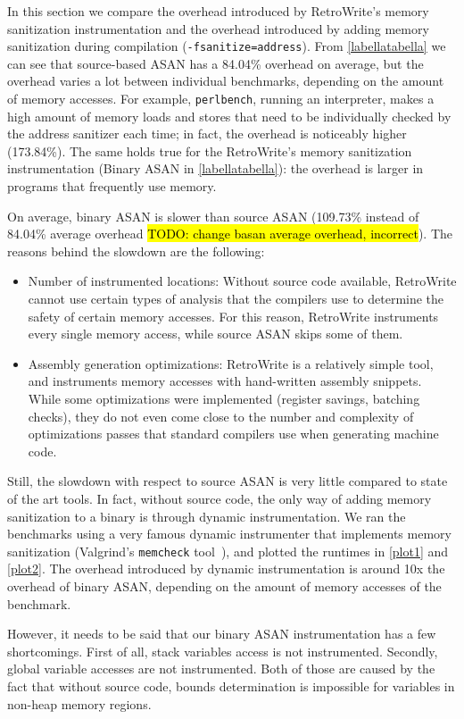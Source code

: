\documentclass[a4paper,11pt,oneside]{report}
\newcommand{\sysname}{RetroWrite\xspace}
\DeclareRobustCommand{\todo}[1]{{\sethlcolor{cyan}\hl{TODO: #1}}}
\begin{document}
In this section we compare the overhead introduced by \sysname's memory
sanitization instrumentation and the overhead introduced by adding memory
sanitization during compilation (\texttt{-fsanitize=address}).  From
\autoref{labellatabella} we can see that source-based ASAN has a 84.04\%
overhead on average, but the overhead varies a lot between individual
benchmarks, depending on the amount of memory accesses. For example,
\texttt{perlbench}, running an interpreter, makes a high amount of memory loads
and stores that need to be individually checked by the address sanitizer each
time; in fact, the overhead is noticeably higher (173.84\%). The same holds
true for the \sysname's memory sanitization instrumentation (Binary ASAN in
\autoref{labellatabella}): the overhead is larger in programs that frequently
use memory. 

On average, binary ASAN is slower than source ASAN (109.73\% instead of 84.04\%
average overhead \todo{change basan average overhead, incorrect}). The reasons
behind the slowdown are the following:
\begin{itemize}
	\item Number of instrumented locations: Without source code available,
		\sysname cannot use certain types of analysis that the compilers use to 
		determine the safety of certain memory accesses. For this reason, \sysname
		instruments every single memory access, while source ASAN skips some of them.
	\item Assembly generation optimizations: \sysname is a relatively simple tool, 
		and instruments memory accesses with hand-written assembly snippets. While
		some optimizations were implemented (register savings, batching checks), they
		do not even come close to the number and complexity of optimizations passes that
		standard compilers use when generating machine code. 
\end{itemize}
Still, the slowdown with respect to source ASAN is very little compared to state of the art tools.
In fact, without source code, the only way of adding memory sanitization to a binary is through
dynamic instrumentation. We ran the benchmarks using a very famous dynamic instrumenter that implements
memory sanitization (Valgrind's \texttt{memcheck} tool~\cite{valgrind}), and plotted the runtimes in
\autoref{plot1} and \autoref{plot2}. The overhead introduced by dynamic instrumentation is around 10x the 
overhead of binary ASAN, depending on the amount of memory accesses of the benchmark. 

However, it needs to be said that our binary ASAN instrumentation has a few shortcomings. First of all,
stack variables access is not instrumented. Secondly, global variable accesses are not instrumented. Both
of those are caused by the fact that without source code, bounds determination is impossible for variables
in non-heap memory regions. 
\end{document}
